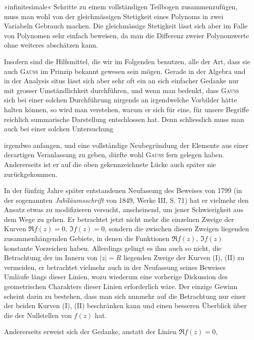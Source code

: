»infinitesimale« Schritte zu einem vollständigen Teilbogen zusammenzufügen,
muss man wohl von der gleichmässigen Stetigkeit eines Polynoms in zwei
Variabeln Gebrauch machen. Die gleichmässige Stetigkeit lässt sich aber im
Falle von Polynomen sehr einfach beweisen, da man die Differenz zweier
Polynomwerte ohne weiteres abschätzen kann.
\par
Insofern sind die Hilfsmittel, die wir im Folgenden benutzen, alle der
Art, dass sie auch \textsc{Gauss} im Prinzip bekannt gewesen sein mögen. Gerade
in der Algebra und in der Analysis situs lässt sich aber sehr oft ein an sich
einfacher Gedanke nur mit grosser Umständlichkeit durchführen, und wenn
man bedenkt, dass \textsc{Gauss} sich bei einer solchen Durchführung nirgends an
irgendwelche Vorbilder hätte halten können, so wird man verstehen, warum
er sich für eine, für unsere Begriffe reichlich summarische Darstellung entschlossen
hat. Denn schliesslich muss man auch bei einer solchen Untersuchung\par
\clearpage{}
\noindent irgendwo anfangen, und eine vollständige Neubegründung der Elemente
aus einer derartigen Veranlassung zu geben, dürfte wohl \textsc{Gauss} fern
gelegen haben. Andererseits ist er auf die oben gekennzeichnete Lücke auch
später nie zurückgekommen.
\par
In der fünfzig Jahre später entstandenen Neufassung des Beweises von
1799 (in der sogenannten \textit{Jubiläumsschrift} von 1849, Werke III, S. 71) hat
er vielmehr den Ansatz etwas zu modifizieren versucht, anscheinend, um jener
Schwierigkeit aus dem Wege zu gehen. Er betrachtet jetzt nicht mehr die
einzelnen Zweige der Kurven \(\Re f(z)=0,\ \Im f(z)=0\), sondern die zwischen
diesen Zweigen liegenden zusammenhängenden Gebiete, in denen die Funktionen
\(\Re f(z),\ \Im f(z)\) konstante Vorzeichen haben. Allerdings gelingt es ihm
auch so nicht, die Betrachtung der im Innern von \(|z|=R\) liegenden Zweige
der Kurven (I), (II) zu vermeiden, er betrachtet vielmehr auch in der Neufassung
seines Beweises Umläufe längs dieser Linien, wozu wiederum eine
vorherige Diskussion des geometrischen Charakters dieser Linien erforderlich
wäre. Der einzige Gewinn scheint darin zu bestehen, dass man sich nunmehr
auf die Betrachtung nur einer der beiden Kurven (I), (II) beschränken
kann und einen besseren Überblick über die  der Nullstellen
von \(f(z)\) hat.
\par
Andererseits erweist sich der Gedanke, anstatt der Linien \(\Re f(z)=0\),
